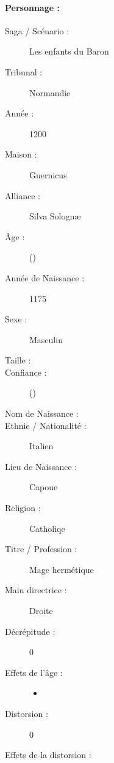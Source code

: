 \pagestyle{fancy}
\thispagestyle{plain}
{\Large \paragraph*{\Large Personnage :} \magusname}
\begin{multicols}{2}
\begin{description}
\item[Saga / Scénario :] Les enfants du Baron
\item[Tribunal :] Normandie
\item[Année :] 1200
\item[Maison :] Guernicus
\item[Alliance :] Silva Solognæ
\item[Âge :] \magusage{} (\magusapparentage)
\item[Année de Naissance :] 1175
\item[Sexe :] Masculin
\item[Taille :] \magussize
\item[Confiance :] \magusconfidencescore{} (\magusconfidencepts)
\columnbreak
\item[Nom de Naissance :] \magusbirthname
\item[Ethnie /  Nationalité :] Italien
\item[Lieu de Naissance :] Capoue
\item[Religion :] Catholiqe
\item[Titre / Profession :] Mage hermétique
\item[Main directrice :] Droite
\vspace{-1em}
\end{description}
\end{multicols}
\begin{multicols}{2}
\begin{description}
\item[Décrépitude :] 0
\item[Effets de l'âge :]\hspace{0pt}
\begin{itemize}
\item
\end{itemize}
\columnbreak
\item[Distorsion :] 0
\item[Effets de la distorsion :]\hspace{0pt}
\magusscarslong
\end{description}
\end{multicols}
